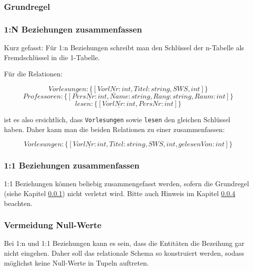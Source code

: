 \subsubsection{Grundregel}\label{sec:ret_schema_grundregel}

    \begin{center}
    \end{center}

\subsubsection{1:N Beziehungen zusammenfassen}

Kurz gefasst: Für 1:n Beziehungen schreibt man den Schlüssel der n-Tabelle als Fremdschlüssel in die 1-Tabelle.

Für die Relationen:

\begin{equation*}
    Vorlesungen : \{[\underline{VorlNr: int}, Titel: string, SWS, int]\}
\end{equation*}
\begin{equation*}
    Professoren : \{[\underline{PersNr: int}, Name: string, Rang: string, Raum: int]\}
\end{equation*}
\begin{equation*}
    lesen : \{[\underline{VorlNr: int}, PersNr: int]\}
\end{equation*}

ist es also ersichtlich, dass \verb"Vorlesungen" sowie \verb"lesen" den gleichen Schlüssel haben. Daher kann man die beiden Relationen zu einer zusammenfassen:

\begin{equation*}
    Vorlesungen : \{[\underline{VorlNr: int}, Titel: string, SWS, int, gelesenVon: int]\}
\end{equation*}

\subsubsection{1:1 Beziehungen zusammenfassen}

1:1 Beziehungen können beliebig zusammengefasst werden, sofern die Grundregel (siehe Kapitel \ref{sec:ret_schema_grundregel}) nicht verletzt wird. Bitte auch Hinweis im Kapitel \ref{sec:null-werte-vermeiden} beachten.

\subsubsection{Vermeidung Null-Werte}\label{sec:null-werte-vermeiden}
Bei 1:n und 1:1 Beziehungen kann es sein, dass die Entitäten die Bezeihung gar nicht eingehen. Daher soll das relationale Schema so konstruiert werden, sodass möglichst keine Null-Werte in Tupeln auftreten.

